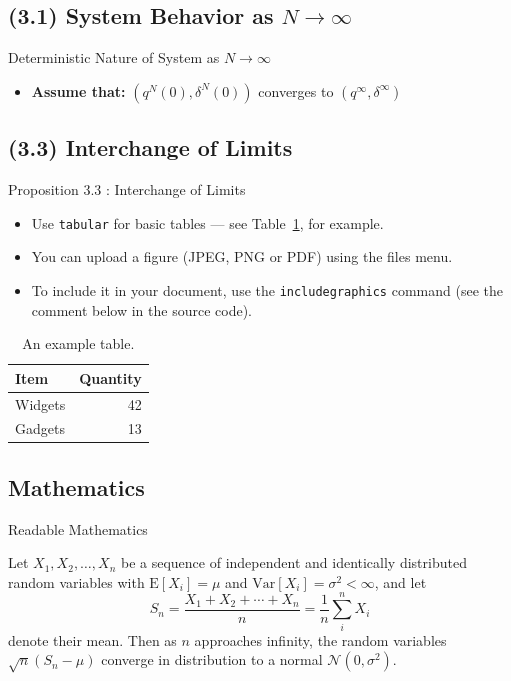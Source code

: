 \documentclass{beamer}
\begin{document}
\subsection{(3.1) System Behavior as $N \rightarrow \infty$}

\begin{frame}{Deterministic Nature of System as $N \rightarrow \infty$}
	\begin{itemize}
		\item \textbf{Assume that:} $(q^{N}(0),\delta^{N}(0)) $ converges to $(q^{\infty},\delta^{\infty})$
	\end{itemize}
\end{frame}


\subsection{(3.3) Interchange of Limits}

\begin{frame}{Proposition 3.3 : Interchange of Limits}

	\begin{itemize}
		\item Use \texttt{tabular} for basic tables --- see Table~\ref{tab:widgets}, for example.
		\item You can upload a figure (JPEG, PNG or PDF) using the files menu.
		\item To include it in your document, use the \texttt{includegraphics} command (see the comment below in the source code).
	\end{itemize}


	\begin{table}
		\centering
		\begin{tabular}{l|r}
			Item    & Quantity \\\hline
			Widgets & 42       \\
			Gadgets & 13
		\end{tabular}
		\caption{\label{tab:widgets}An example table.}
	\end{table}

\end{frame}

\subsection{Mathematics}

\begin{frame}{Readable Mathematics}

	Let $X_1, X_2, \ldots, X_n$ be a sequence of independent and identically distributed random variables with $\text{E}[X_i] = \mu$ and $\text{Var}[X_i] = \sigma^2 < \infty$, and let
	$$S_n = \frac{X_1 + X_2 + \cdots + X_n}{n}
		= \frac{1}{n}\sum_{i}^{n} X_i$$
	denote their mean. Then as $n$ approaches infinity, the random variables $\sqrt{n}(S_n - \mu)$ converge in distribution to a normal $\mathcal{N}(0, \sigma^2)$.

\end{frame}
\end{document}

